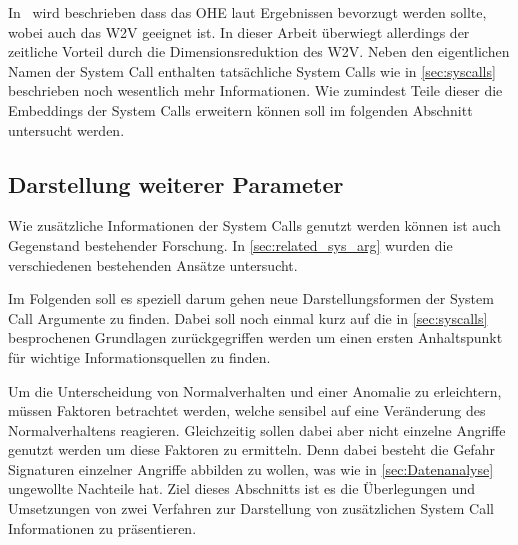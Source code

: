             In~\cite{W2VWUNDERLICH2019} wird beschrieben dass das \ac{OHE} laut Ergebnissen bevorzugt werden sollte, wobei auch das \ac{W2V} geeignet ist.
            In dieser Arbeit überwiegt allerdings der zeitliche Vorteil durch die Dimensionsreduktion des \ac{W2V}.
            Neben den eigentlichen Namen der System Call enthalten tatsächliche System Calls wie in \autoref{sec:syscalls} beschrieben noch wesentlich mehr Informationen.
            Wie zumindest Teile dieser die Embeddings der System Calls erweitern können soll im folgenden Abschnitt untersucht werden.

        \subsection{Darstellung weiterer Parameter}\label{sec:Meta}
                Wie zusätzliche Informationen der System Calls genutzt werden können ist auch Gegenstand bestehender Forschung.
                In \autoref{sec:related_sys_arg} wurden die verschiedenen bestehenden Ansätze untersucht.

                Im Folgenden soll es speziell darum gehen neue Darstellungsformen der System Call Argumente zu finden.
                Dabei soll noch einmal kurz auf die in \autoref{sec:syscalls} besprochenen Grundlagen zurückgegriffen werden um einen ersten Anhaltspunkt für wichtige Informationsquellen zu finden.

                Um die Unterscheidung von Normalverhalten und einer Anomalie zu erleichtern, müssen Faktoren betrachtet werden, welche sensibel auf eine Veränderung des Normalverhaltens reagieren.
                Gleichzeitig sollen dabei aber nicht einzelne Angriffe genutzt werden um diese Faktoren zu ermitteln.
                Denn dabei besteht die Gefahr Signaturen einzelner Angriffe abbilden zu wollen, was wie in \autoref{sec:Datenanalyse} ungewollte Nachteile hat.
                Ziel dieses Abschnitts ist es die Überlegungen und Umsetzungen von zwei Verfahren zur Darstellung von zusätzlichen System Call Informationen zu präsentieren.

